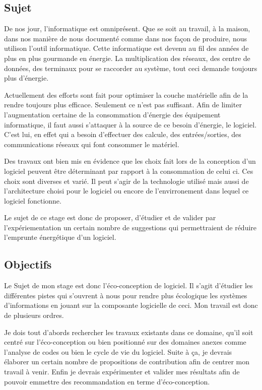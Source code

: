 \documentclass[a4paper, 11pt]{report}
\begin{document}
\subsection{Sujet}
De nos jour, l'informatique est omniprésent. Que se soit au travail, à la maison, dans nos manière de nous documenté comme dans nos façon de produire, nous utilison l'outil informatique. Cette informatique est devenu au fil des années de plus en plus gourmande en énergie. La multiplication des réseaux, des centre de données, des terminaux pour se raccorder au système, tout ceci demande toujours plus d'énergie.

Actuellement des efforts sont fait pour optimiser la couche matérielle afin de la rendre toujours plus efficace. Seulement ce n'est pas suffisant. Afin de limiter l'augmentation certaine de la consommation d'énergie des équipement informatique, il faut aussi s'attaquer à la source de ce besoin d'énergie, le logiciel. C'est lui, en effet qui a besoin d'effectuer des calcule, des entrées/sorties, des communications réseaux qui font consommer le matériel.

Des travaux ont bien mis en évidence que les choix fait lors de la conception d'un logiciel peuvent être déterminant par rapport à la consommation de celui ci. Ces choix sont diverses et varié. Il peut s'agir de la technologie utilisé mais aussi de l'architecture choisi pour le logiciel ou encore de l'envirronement dans lequel ce logiciel fonctionne.

Le sujet de ce stage est donc de proposer, d'étudier et de valider par l'expériementation un certain nombre de suggestions qui permettraient de réduire l'emprunte énergétique d'un logiciel.

\subsection{Objectifs}
Le Sujet de mon stage est donc l'éco-conception de logiciel. Il s'agit d'étudier les différentes pistes qui s'ouvrent à nous pour rendre plus écologique les systèmes d'informations en jouant sur la composante logicielle de ceci. Mon travail est donc de plusieurs ordres.

Je dois tout d'abords rechercher les travaux existants dans ce domaine, qu'il soit centré sur l'éco-conception ou bien positionné sur des domaines anexes comme l'analyse de codes ou bien le cycle de vie du logiciel. Suite à ça, je devrais élaborer un certain nombre de propositions de contribution afin de centrer mon travail à venir. Enfin je devrais expérimenter et valider mes résultats afin de pouvoir emmettre des recommandation en terme d'éco-conception.
\end{document}
